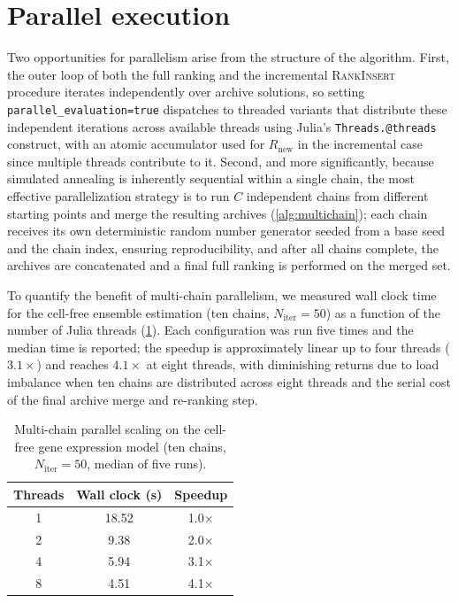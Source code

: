\documentclass[preprint,review,12pt]{elsarticle}
\begin{document}
\section{Parallel execution}\label{sec:si_parallel}
Two opportunities for parallelism arise from the structure of the algorithm.
First, the outer loop of both the full ranking and the incremental \textsc{RankInsert} procedure iterates independently over archive solutions, so setting \texttt{parallel\_evaluation=true} dispatches to threaded variants that distribute these independent iterations across available threads using Julia's \texttt{Threads.@threads} construct, with an atomic accumulator used for $R_{\text{new}}$ in the incremental case since multiple threads contribute to it.
Second, and more significantly, because simulated annealing is inherently sequential within a single chain, the most effective parallelization strategy is to run $C$ independent chains from different starting points and merge the resulting archives (\cref{alg:multichain}); each chain receives its own deterministic random number generator seeded from a base seed and the chain index, ensuring reproducibility, and after all chains complete, the archives are concatenated and a final full ranking is performed on the merged set.

To quantify the benefit of multi-chain parallelism, we measured wall clock time for the cell-free ensemble estimation (ten chains, $N_{\text{iter}} = 50$) as a function of the number of Julia threads (\cref{tab:scaling}).
Each configuration was run five times and the median time is reported; the speedup is approximately linear up to four threads ($3.1\times$) and reaches $4.1\times$ at eight threads, with diminishing returns due to load imbalance when ten chains are distributed across eight threads and the serial cost of the final archive merge and re-ranking step.

\begin{table}[ht]
\centering
\caption{Multi-chain parallel scaling on the cell-free gene expression model (ten chains, $N_{\text{iter}} = 50$, median of five runs).}\label{tab:scaling}
\begin{tabular}{@{}ccc@{}}
\toprule
\textbf{Threads} & \textbf{Wall clock (s)} & \textbf{Speedup} \\
\midrule
1 & 18.52 & 1.0$\times$ \\
2 &  9.38 & 2.0$\times$ \\
4 &  5.94 & 3.1$\times$ \\
8 &  4.51 & 4.1$\times$ \\
\bottomrule
\end{tabular}
\end{table}
\end{document}
